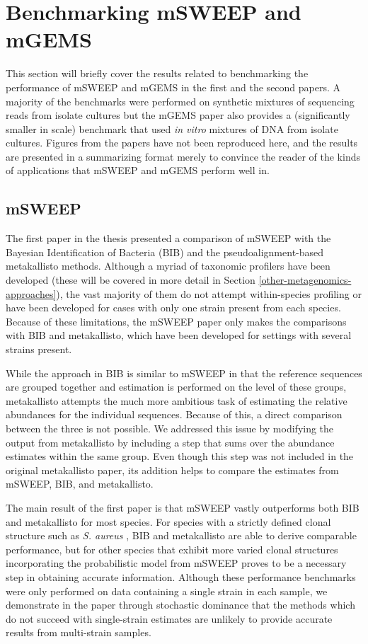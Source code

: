 \documentclass[officiallayout]{tktla}
\begin{document}
\section{Benchmarking mSWEEP and mGEMS}
This section will briefly cover the results related to benchmarking
the performance of mSWEEP and mGEMS in the first and the second
papers. A majority of the benchmarks were performed on synthetic
mixtures of sequencing reads from isolate cultures but the mGEMS paper
also provides a (significantly smaller in scale) benchmark that used
\textit{in vitro} mixtures of DNA from isolate cultures. Figures from
the papers have not been reproduced here, and the results are
presented in a summarizing format merely to convince the reader of the
kinds of applications that mSWEEP and mGEMS perform well in.

\subsection{mSWEEP}
The first paper in the thesis presented a comparison of mSWEEP with
the Bayesian Identification of Bacteria (BIB) and the
pseudoalignment-based metakallisto methods. Although a myriad of
taxonomic profilers have been developed (these will be covered in more
detail in Section \ref{other-metagenomics-approaches}), the vast
majority of them do not attempt within-species profiling or have been
developed for cases with only one strain present from each
species. Because of these limitations, the mSWEEP paper only makes the
comparisons with BIB and metakallisto, which have been developed for
settings with several strains present.

While the approach in BIB is similar to mSWEEP in that the reference
sequences are grouped together and estimation is performed on the
level of these groups, metakallisto attempts the much more ambitious
task of estimating the relative abundances for the individual
sequences. Because of this, a direct comparison between the three is
not possible. We addressed this issue by modifying the output from
metakallisto by including a step that sums over the abundance
estimates within the same group. Even though this step was not
included in the original metakallisto paper, its addition helps to
compare the estimates from mSWEEP, BIB, and metakallisto.

The main result of the first paper is that mSWEEP vastly outperforms
both BIB and metakallisto for most species. For species with a
strictly defined clonal structure \textemdash such as
\textit{S. aureus} \textemdash, BIB and metakallisto are able to derive
comparable performance, but for other species that exhibit more varied
clonal structures incorporating the probabilistic model from mSWEEP
proves to be a necessary step in obtaining accurate
information. Although these performance benchmarks were only performed
on data containing a single strain in each sample, we demonstrate in
the paper through stochastic dominance that the methods which do not
succeed with single-strain estimates are unlikely to provide accurate
results from multi-strain samples.
\end{document}
